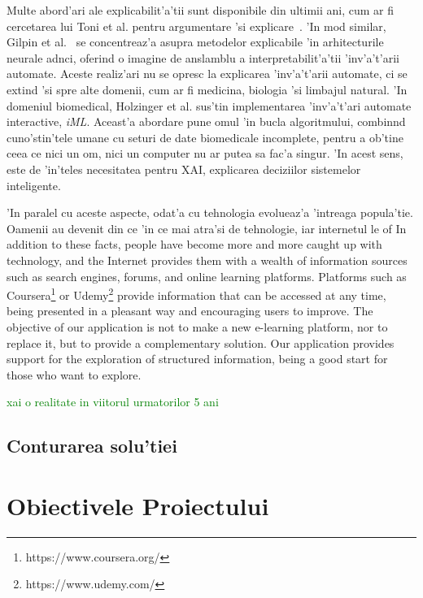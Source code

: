 \documentclass[12pt,a4paper,twoside]{report}
\begin{document}
Multe abord'ari ale explicabilit'a'tii sunt disponibile din ultimii ani, cum ar fi cercetarea lui Toni et al. pentru argumentare 'si explicare~\cite{ANNWithXAI}. 'In mod similar, Gilpin et al.~\cite{Gilpin2019ExplainingLearning} se concentreaz'a asupra metodelor explicabile 'in arhitecturile neurale ad\ia nci, oferind o imagine de anslamblu a interpretabilit'a'tii 'inv'a't'arii automate. Aceste realiz'ari nu se opresc la explicarea 'inv'a't'arii automate, ci se extind 'si spre alte domenii, cum ar fi medicina, biologia 'si limbajul natural. 
'In domeniul biomedical, Holzinger et al. \cite{Holzinger2018FromAI} sus'tin implementarea 'inv'a't'ari automate interactive, {\it iML}. Aceast'a abordare pune omul 'in bucla algoritmului, combin\ia nd cuno'stin'tele umane cu seturi de date biomedicale incomplete, pentru a ob'tine ceea ce nici un om, nici un computer nu ar putea sa fac'a singur. 'In acest sens, este de 'in'teles necesitatea pentru XAI, explicarea deciziilor sistemelor inteligente. 

'In paralel cu aceste aspecte, odat'a cu tehnologia evolueaz'a 'intreaga popula'tie. Oamenii au devenit din ce 'in ce mai atra'si de tehnologie, iar internetul le of
In addition to these facts, people have become more and more caught up with technology, and the Internet provides them with a wealth of information sources such as search engines, forums, and online learning platforms. 
Platforms such as Coursera\footnote{https://www.coursera.org/} or Udemy\footnote{https://www.udemy.com/} provide information that can be accessed at any time, being presented in a pleasant way and encouraging users to improve. The objective of our application is not to make a new e-learning platform, nor to replace it, but to provide a complementary solution. Our application provides support for the exploration of structured information, being a good start for those who want to explore.

\textcolor{green}{xai o realitate in viitorul urmatorilor 5 ani}

\section{Conturarea solu'tiei}

\chapter{Obiectivele Proiectului}
\end{document}
